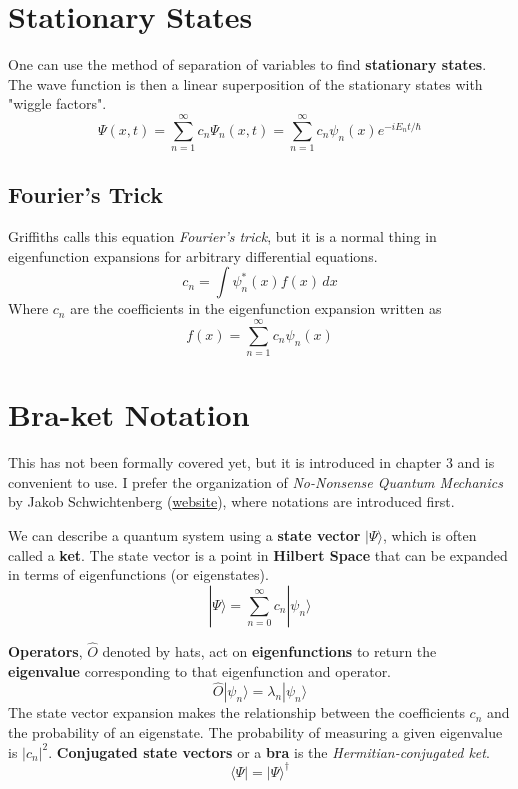 \section{Stationary States}
One can use the method of separation of variables to find \textbf{stationary states}. The wave function is then a linear superposition of the stationary states with "wiggle factors".
\begin{equation} \label{eq:stationarystates}
    \Psi(x,t) = \sum_{n=1}^\infty c_n \Psi_n(x,t) = \sum_{n=1}^\infty c_n \psi_n(x) e^{-iE_nt/\hbar}
\end{equation}

\subsection{Fourier's Trick}
Griffiths calls this equation \textit{Fourier's trick}, but it is a normal thing in eigenfunction expansions for arbitrary differential equations.
\begin{equation}\label{eq:fouriertrick}
    c_n = \int \psi_n^*(x) f(x) \,dx
\end{equation}
Where $c_n$ are the coefficients in the eigenfunction expansion written as
\begin{equation}\label{eq:eigenexpansion}
    f(x) = \sum_{n=1}^\infty c_n \psi_n(x)
\end{equation}


\section{Bra-ket Notation}
This has not been formally covered yet, but it is introduced in chapter 3 and is convenient to use. I prefer the organization of \textit{No-Nonsense Quantum Mechanics} by Jakob Schwichtenberg (\href{https://nononsensebooks.com/}{website}), where notations are introduced first.

We can describe a quantum system using a \textbf{state vector} $|\Psi\rangle$, which is often called a \textbf{ket}. The state vector is a point in \textbf{Hilbert Space} that can be expanded in terms of eigenfunctions (or eigenstates).
\begin{equation*}
    |\Psi\rangle = \sum_{n=0}^\infty c_n |\psi_n\rangle
\end{equation*}

\textbf{Operators}, $\hat{O}$ denoted by hats, act on \textbf{eigenfunctions} to return the \textbf{eigenvalue} corresponding to that eigenfunction and operator.
\begin{equation*}
    \hat{O}|\psi_n\rangle = \lambda_n|\psi_n\rangle
\end{equation*}
The state vector expansion makes the relationship between the coefficients $c_n$ and the probability of an eigenstate. The probability of measuring a given eigenvalue is $|c_n|^2$. \textbf{Conjugated state vectors} or a \textbf{bra} is the \textit{Hermitian-conjugated ket}.
\begin{equation*}
    \langle \Psi | = |\Psi\rangle ^\dagger
\end{equation*}

